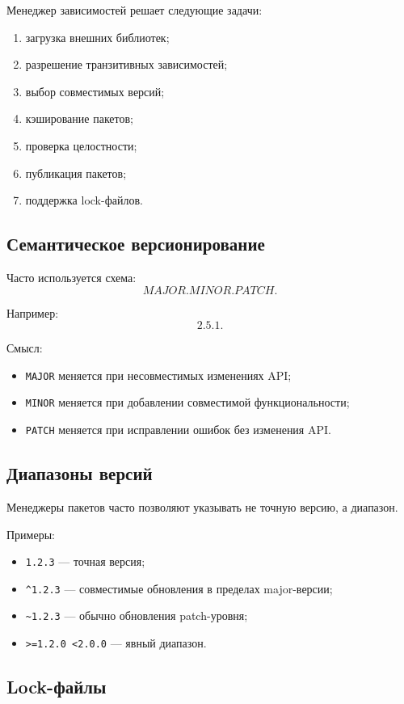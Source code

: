 \documentclass[12pt,a4paper]{article}
\begin{document}
Менеджер зависимостей решает следующие задачи:
\begin{enumerate}
    \item загрузка внешних библиотек;
    \item разрешение транзитивных зависимостей;
    \item выбор совместимых версий;
    \item кэширование пакетов;
    \item проверка целостности;
    \item публикация пакетов;
    \item поддержка lock-файлов.
\end{enumerate}

\subsection{Семантическое версионирование}

Часто используется схема:
\[
MAJOR.MINOR.PATCH.
\]

Например:
\[
2.5.1.
\]

Смысл:
\begin{itemize}
    \item \texttt{MAJOR} меняется при несовместимых изменениях API;
    \item \texttt{MINOR} меняется при добавлении совместимой функциональности;
    \item \texttt{PATCH} меняется при исправлении ошибок без изменения API.
\end{itemize}

\subsection{Диапазоны версий}

Менеджеры пакетов часто позволяют указывать не точную версию, а диапазон.

Примеры:
\begin{itemize}
    \item \texttt{1.2.3} --- точная версия;
    \item \texttt{\^{}1.2.3} --- совместимые обновления в пределах major-версии;
    \item \texttt{\~{}1.2.3} --- обычно обновления patch-уровня;
    \item \texttt{>=1.2.0 <2.0.0} --- явный диапазон.
\end{itemize}

\subsection{Lock-файлы}
\end{document}
